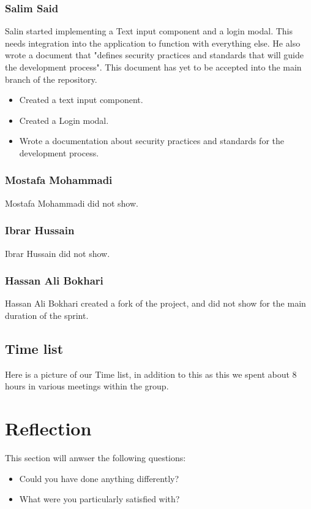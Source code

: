 \documentclass[12pt]{article}
\begin{document}
\subsubsection{Salim Said}
Salin started implementing a Text input component and a login modal. This needs integration into the application to function with everything 
else. He also wrote a document that "defines security practices and standards that will guide the development process"\cite*{ShowitDocsSecurity}. 
This document has yet to be accepted into the main branch of the repository.
    \begin{itemize}
        \item Created a text input component.
        \item Created a Login modal.
        \item Wrote a documentation about security practices and standards for the development process.
    \end{itemize}
\subsubsection{Mostafa Mohammadi}
Mostafa Mohammadi did not show.
\subsubsection{Ibrar Hussain}
Ibrar Hussain did not show.
\subsubsection{Hassan Ali Bokhari}
Hassan Ali Bokhari created a fork of the project, and did not show for the main duration of the sprint.

\subsection{Time list}

Here is a picture of our Time list, in addition to this as this we spent about 8 hours in various meetings within the group.

\section{Reflection}
This section will anwser the following questions:
\begin{itemize}
    \item Could you have done anything differently?
    \item What were you particularly satisfied with?
\end{itemize}
\end{document}
